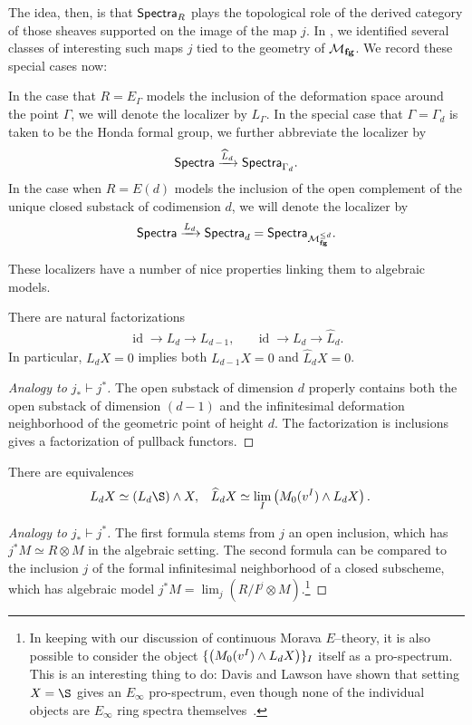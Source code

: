 The idea, then, is that $\mathsf{Spectra}_R$ plays the topological role of the derived category of those sheaves supported on the image of the map $j$.  In , we identified several classes of interesting such maps $j$ tied to the geometry of $\mathcal{M}_{\mathbf{fg}}$.  We record these special cases now:
\begin{definition}
In the case that $R = E_\Gamma$ models the inclusion of the deformation space around the point $\Gamma$, we will denote the localizer by $L_\Gamma$.  In the special case that $\Gamma = \Gamma_d$ is taken to be the Honda formal group, we further abbreviate the localizer by \[\mathsf{Spectra} \xrightarrow{\widehat L_d} \mathsf{Spectra}_{\Gamma_d}.\]  In the case when $R = E(d)$ models the inclusion of the open complement of the unique closed substack of codimension $d$, we will denote the localizer by \[\mathsf{Spectra} \xrightarrow{L_d} \mathsf{Spectra}_d = \mathsf{Spectra}_{\mathcal{M}_{\mathbf{fg}}^{\le d}}.\]
\end{definition}

These localizers have a number of nice properties linking them to algebraic models.

\begin{lemma}
There are natural factorizations
\begin{align*}
\operatorname{id} \to L_d \to L_{d-1}, & & \operatorname{id} \to L_d \to \widehat L_d.
\end{align*}
In particular, $L_d X = 0$ implies both $L_{d-1} X = 0$ and $\widehat L_d X = 0$.
\end{lemma}
\begin{proof}[Analogy to $j_* \vdash j^*$]
The open substack of dimension $d$ properly contains both the open substack of dimension $(d-1)$ and the infinitesimal deformation neighborhood of the geometric point of height $d$.  The factorization is inclusions gives a factorization of pullback functors.
\end{proof}

\begin{lemma}\label{FormulaForKnLocalization}
There are equivalences
\begin{align*}
L_d X & \simeq (L_d \S) \sm X, &
\widehat L_d X & \simeq \lim_I \left( M_0(v^I) \sm L_d X \right).
\end{align*}
\end{lemma}
\begin{proof}[Analogy to $j_* \vdash j^*$]
The first formula stems from $j$ an open inclusion, which has $j^* M \simeq R \otimes M$ in the algebraic setting.  The second formula can be compared to the inclusion $j$ of the formal infinitesimal neighborhood of a closed subscheme, which has algebraic model $j^* M = \lim_j (R/I^j \otimes M)$.\footnote{In keeping with our discussion of continuous Morava $E$--theory, it is also possible to consider the object $\{\left( M_0(v^I) \wedge L_d X \right)\}_I$ itself as a pro-spectrum.  This is an interesting thing to do: Davis and Lawson have shown that setting $X = \S$ gives an $E_\infty$ pro-spectrum, even though none of the individual objects are $E_\infty$ ring spectra themselves~\cite{DavisLawson}.}
\end{proof}

